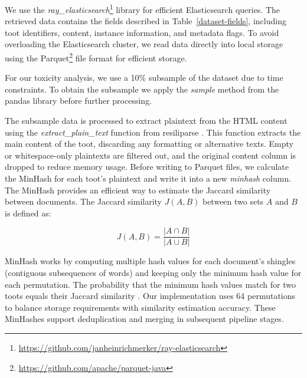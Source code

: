 We use the \textit{ray\_elasticsearch}\footnote{\url{https://github.com/janheinrichmerker/ray-elasticsearch}} library for efficient Elasticsearch queries. The retrieved data contains the fields described in Table~\ref{dataset-fields}, including toot identifiers, content, instance information, and metadata flags. To avoid overloading the Elasticsearch cluster, we read data directly into local storage using the Parquet\footnote{\url{https://github.com/apache/parquet-java}} file format for efficient storage.

For our toxicity analysis, we use a 10\% subsample of the dataset due to time constraints. To obtain the subsample we apply the \textit{sample} method from the pandas library before further processing.

The subsample data is processed to extract plaintext from the HTML content using the \textit{extract\_plain\_text} function from resiliparse \cite{bevendorff:2018}. This function extracts the main content of the toot, discarding any formatting or alternative texts. Empty or whitespace-only plaintexts are filtered out, and the original content column is dropped to reduce memory usage. Before writing to Parquet files, we calculate the MinHash for each toot's plaintext and write it into a new \textit{minhash} column. The MinHash provides an efficient way to estimate the Jaccard similarity between documents. The Jaccard similarity $J(A,B)$ between two sets $A$ and $B$ is defined as:

\begin{equation}
J(A,B) = \frac{|A \cap B|}{|A \cup B|}
\end{equation}

MinHash works by computing multiple hash values for each document's shingles (contiguous subsequences of words) and keeping only the minimum hash value for each permutation. The probability that the minimum hash values match for two toots equals their Jaccard similarity \cite{broder:2000}. Our implementation uses 64 permutations to balance storage requirements with similarity estimation accuracy. These MinHashes support deduplication and merging in subsequent pipeline stages.


